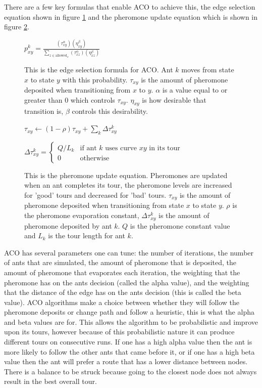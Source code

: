 There are a few key formulas that enable ACO to achieve this, the edge selection equation shown in figure \ref{eq:ACOEdgeselection} and the pheromone update equation which is shown in figure \ref{eq:pheremoneupdate}. 

\begin{figure}[h]
    \centering
    $
    p_{xy}^k =
    \frac
    { (\tau_{xy}^{\alpha}) (\eta_{xy}^{\beta}) }
    { \sum_{z\in \mathrm{allowed}_x} (\tau_{xz}^{\alpha}) (\eta_{xz}^{\beta}) }$
    \caption{This is the edge selection formula for ACO. Ant $k$ moves from state $x$ to state $y$ with this probability. $\tau_{xy}$ is the amount of pheromone deposited when transitioning from $x$ to $y$. $\alpha$ is a value equal to or greater than 0 which controls $\tau_{xy}$. $\eta_{xy}$ is how desirable that transition is, $\beta$ controls this desirability.}
    \label{eq:ACOEdgeselection}
\end{figure}

\begin{figure}[h]
    \centering
    $ \tau_{xy} \leftarrow
    (1-\rho)\tau_{xy} + \sum_{k}\Delta \tau^{k}_{xy}$
    
    $\Delta \tau^{k}_{xy} =
    \begin{cases}
    Q/L_k & \mbox{if ant }k\mbox{ uses curve }xy\mbox{ in its tour} \\
    0 & \mbox{otherwise}
    \end{cases}$
    \caption{This is the pheromone update equation. Pheromones are updated when an ant completes its tour, the pheromone levels are increased for 'good' tours and decreased for 'bad' tours. $\tau_{xy}$ is the amount of pheromone deposited when transitioning from state $x$ to state $y$. $\rho$ is the pheromone evaporation constant, $\Delta \tau^{k}_{xy}$ is the amount of pheromone deposited by ant $k$. $Q$ is the pheromone constant value and $L_k$ is the tour length for ant $k$.}
    \label{eq:pheremoneupdate}
\end{figure}

ACO has several parameters one can tune: the number of iterations, the number of ants that are simulated, the amount of pheromone that is deposited, the amount of pheromone that evaporates each iteration, the weighting that the pheromone has on the ants decision (called the alpha value), and the weighting that the distance of the edge has on the ants decision (this is called the beta value). ACO algorithms make a choice between whether they will follow the pheromone deposits or change path and follow a heuristic, this is what the alpha and beta values are for. This allows the algorithm to be probabilistic and improve upon its tours, however because of this probabilistic nature it can produce different tours on consecutive runs. If one has a high alpha value then the ant is more likely to follow the other ants that came before it, or if one has a high beta value then the ant will prefer a route that has a lower distance between nodes. There is a balance to be struck because going to the closest node does not always result in the best overall tour.

